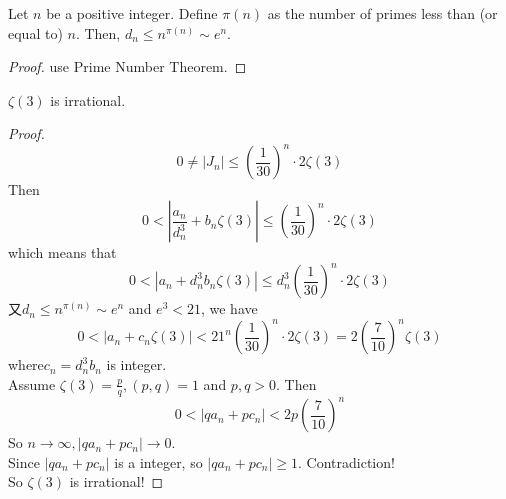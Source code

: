 \begin{lemma}\label{dn_asymptotic}
    Let $n$ be a positive integer. Define $\pi(n)$ as the number of primes less than (or equal to) $n$. Then, $d_n \leqslant n^{\pi(n)} \sim e^n$.
\end{lemma}
\begin{proof}
    use Prime Number Theorem. 
\end{proof}

\begin{theorem}\label{zeta_3_irrational}
    $\zeta(3)$ is irrational.
\end{theorem}
\begin{proof}
    \[ 0 \neq |J_n| \leqslant (\frac{1}{30})^n\cdot 2\zeta(3) \]
    Then 
    \[ 0 < |\frac{a_n}{d_n^3} + b_n\zeta(3)| \leqslant (\frac{1}{30})^n\cdot 2\zeta(3) \]
    which means that 
    \[ 0 < |a_n + d_n^3 b_n\zeta(3)| \leqslant d_n^3(\frac{1}{30})^n\cdot 2\zeta(3) \] 
    又$d_n \leqslant n^{\pi(n)} \sim e^n$ and $e^3 < 21$, we have
    \[ 0 < |a_n + c_n\zeta(3)| < 21^n (\frac{1}{30})^n\cdot 2\zeta(3) = 2(\frac{7}{10})^n \zeta(3) \]
    where$c_n = d_n^3 b_n$ is integer.\\
    Assume $\zeta(3) = \frac{p}{q}, (p,q)=1$ and $p,q>0$. Then 
    \[ 0 < |qa_n + pc_n| < 2p (\frac{7}{10})^n \]
    So $n \rightarrow \infty, |qa_n + pc_n| \rightarrow 0$.\\
    Since $|qa_n + pc_n|$ is a integer, so $|qa_n + pc_n| \geqslant 1$. Contradiction! \\
    So $\zeta(3)$ is irrational!
\end{proof}